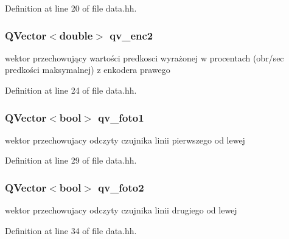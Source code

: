 Definition at line 20 of file data.\+hh.

\subsubsection[{\texorpdfstring{qv\+\_\+enc2}{qv_enc2}}]{\setlength{\rightskip}{0pt plus 5cm}Q\+Vector$<$double$>$ qv\+\_\+enc2}\hypertarget{data_8hh_a27197c526976a0915f076136a315fa97}{}\label{data_8hh_a27197c526976a0915f076136a315fa97}


wektor przechowujący wartości predkosci wyrażonej w procentach (obr/sec predkości maksymalnej) z enkodera prawego 



Definition at line 24 of file data.\+hh.

\subsubsection[{\texorpdfstring{qv\+\_\+foto1}{qv_foto1}}]{\setlength{\rightskip}{0pt plus 5cm}Q\+Vector$<$bool$>$ qv\+\_\+foto1}\hypertarget{data_8hh_a4c943bbf0a28f870f94a6967ca60a02e}{}\label{data_8hh_a4c943bbf0a28f870f94a6967ca60a02e}


wektor przechowujacy odczyty czujnika linii pierwszego od lewej 



Definition at line 29 of file data.\+hh.

\subsubsection[{\texorpdfstring{qv\+\_\+foto2}{qv_foto2}}]{\setlength{\rightskip}{0pt plus 5cm}Q\+Vector$<$bool$>$ qv\+\_\+foto2}\hypertarget{data_8hh_a11ca3b0ceef174cba212b38ef96a990d}{}\label{data_8hh_a11ca3b0ceef174cba212b38ef96a990d}


wektor przechowujacy odczyty czujnika linii drugiego od lewej 



Definition at line 34 of file data.\+hh.

